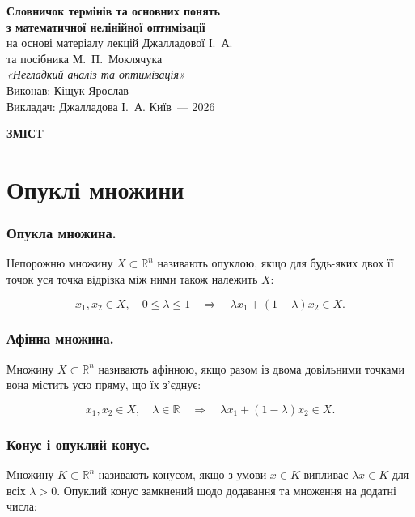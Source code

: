 \documentclass[12pt,a4paper]{extarticle}
\makeatletter
\renewcommand{\contentsname}{Зміст}%
\numberwithin{section}{part}
\renewcommand\tableofcontents{%
  \clearpage
  \begin{center}
    {\large\bfseries\MakeUppercase{\contentsname}}
  \end{center}
  \vspace{0.8em}
  \begingroup
    \singlespacing
    \RaggedRight
    \setlength{\parindent}{0pt}%
    \setlength{\parskip}{0pt}%
    \@starttoc{toc}%
  \endgroup
}
\makeatother
\begin{document}
\begin{titlepage}
\thispagestyle{empty}
\begin{center}
\vspace*{3cm}
{\Large\bfseries Словничок термінів та основних понять\\[0.3em] з математичної нелінійної оптимізації}\\[1.2cm]
{\normalsize на основі матеріалу лекцій Джалладової І.~А.\\ та посібника М.~П.~Моклячука\\[0.2em] \emph{«Негладкий аналіз та оптимізація»}}\\[2cm]
{\large Виконав: Кіщук Ярослав}\\[0.4cm]
{\normalsize Викладач: Джалладова І.~А.}
\vfill
{\normalsize Київ~--- 2026}
\end{center}
\end{titlepage}

\tableofcontents
\clearpage
\part{Опуклі множини}

\section{Опукла множина.}
Непорожню множину $X \subset \mathbb{R}^{n}$ називають опуклою, якщо для будь-яких двох її точок уся точка відрізка між ними також належить $X$:

$$
x_{1}, x_{2} \in X, \quad 0 \leq \lambda \leq 1 \quad \Longrightarrow \quad \lambda x_{1}+(1-\lambda) x_{2} \in X .
$$

\section{Афінна множина.}
Множину $X \subset \mathbb{R}^{n}$ називають афінною, якщо разом із двома довільними точками вона містить усю пряму, що їх з’єднує:

$$
x_{1}, x_{2} \in X, \quad \lambda \in \mathbb{R} \quad \Longrightarrow \quad \lambda x_{1}+(1-\lambda) x_{2} \in X .
$$

\section{Конус і опуклий конус.}
Множину $K \subset \mathbb{R}^{n}$ називають конусом, якщо з умови $x \in K$ випливає $\lambda x \in K$ для всіх $\lambda>0$. Опуклий конус замкнений щодо додавання та множення на додатні числа:
\end{document}
